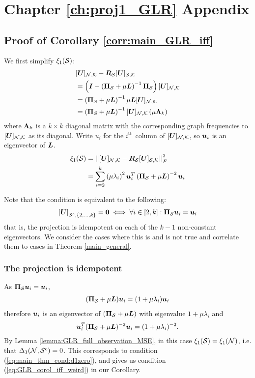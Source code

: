 \chapter{\label{app:2-proj1}Chapter \ref{ch:proj1_GLR} Appendix}

\section{Proof of Corollary \ref{corr:main_GLR_iff}}
\label{app:proof_main_GLR_iff}
We first simplify $\xi_{1}(\mathcal{S})$:
\begin{align}
    &\matrsubU{N} - \matr{R}_{\set{S}}\matrsubU{S} \\
    &= \left(\matr{I} - \left(\proj{S} + \mu\matr{L} \right)^{-1}\proj{S}\right)\matrsubU{N}  \\
    &=  \left(\proj{S} + \mu\matr{L} \right)^{-1}\mu\matr{L}\matrsubU{N} \\
    &=  \left(\proj{S} + \mu\matr{L} \right)^{-1}\matrsubU{N}\left(\mu\matr{\Lambda}_{k}\right)
\end{align}
where $\bm{\Lambda}_{k}$ is a $k \times k$ diagonal matrix with the corresponding graph frequencies to $\matrsubU{N}$ as its diagonal. Write $u_{i}$ for the $i^{\textrm{th}}$ column of $\matrsubU{N}$, so $\bm{u}_{i}$ is an eigenvector of $\bm{L}$. 
\begin{align}
    \xi_{1}(\set{S}) &= \sqfrob{\matrsubU{N} - \matr{R}_{\set{S}}\matrsubU{S}}  \\
    &= \sum_{i=2}^{k} \left(\mu\lambda_{i}\right)^{2}\vect{u}_{i}^{T}\left(\proj{S} + \mu\matr{L} \right)^{-2}\vect{u}_{i} \label{eq:GLR_corr_proof:xi_1_def}
\end{align}

Note that the condition is equivalent to the following:
\begin{equation}
    \msubgen[\set{S}^{c},\{2,\ldots,k\}]{\matr{U}} = \matr{0} \iff \forall i \in [2,k]: \proj{S}\vect{u}_{i} = \vect{u}_{i}
\end{equation}
that is, the projection is idempotent on each of the $k-1$ non-constant eigenvectors. We consider the cases where this is and is not true and correlate them to cases in Theorem \ref{main_general}.

\subsection{The projection is idempotent}
\label{subapp:GLR_iff_proof:idempotent}
As $\proj{S}\vect{u}_{i} = \vect{u}_{i}$,
\begin{equation}
   (\proj{S} + \mu \matr{L})\vect{u}_{i} = (1 + \mu\lambda_{i})\vect{u}_{i} 
\end{equation}
therefore $\bm{u}_{i}$ is an eigenvector of $(\proj{S} + \mu \matr{L})$ with eigenvalue $1 + \mu\lambda_{i}$ and
\begin{align}
    \vect{u}_{i}^{T}(\proj{S} + \mu \matr{L})^{-2}\vect{u}_{i} = (1 + \mu\lambda_{i})^{-2}.
\end{align}
By Lemma \ref{lemma:GLR_full_observation_MSE}, in this case $\xi_{1}(\mathcal{S}) = \xi_{1}(\mathcal{N})$, i.e. that $\Delta_{1}(\mathcal{N},\mathcal{S}^{c}) = 0$. This corresponds to condition (\ref{eq:main_thm_cond:d1zero}), and gives us condition (\ref{eq:GLR_corol_iff_weird}) in our Corollary.
